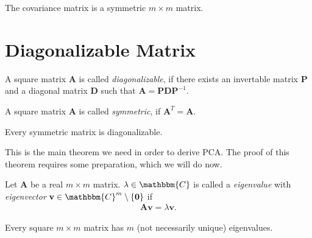 The covariance matrix is a symmetric $m\times m$ matrix.

\section{Diagonalizable Matrix}
\label{sec:diagonalizable_matrix}

\begin{definition}
	A square matrix $\mathbf{A}$ is called \textit{diagonalizable}, if there exists an invertable matrix $\mathbf{P}$ and a diagonal matrix $\mathbf{D}$ such that $\mathbf{A} = \mathbf{P}\mathbf{D}\mathbf{P}^{-1}$.
\end{definition}

\begin{definition}
	A square matrix $\mathbf{A}$ is called \textit{symmetric}, if $\mathbf{A}^T = \mathbf{A}$.
\end{definition}

\begin{theorem}
	\label{th:symmetric_matrix_diagonalizable}
	Every symmetric matrix is diagonalizable.
\end{theorem}

This is the main theorem we need in order to derive PCA. The proof of this theorem requires some preparation, which we will do now.

\begin{definition}
	Let $\mathbf{A}$ be a real $m\times m$ matrix. $\lambda \in \mathbbm{C}$ is called a \textit{eigenvalue} with \textit{eigenvector} $\mathbf{v} \in \mathbbm{C}^m\setminus\{\mathbf{0}\}$ if
	\begin{align}
		\label{eq:def_eigenvalue}
		\mathbf{Av} = \lambda \mathbf{v}.
	\end{align}
\end{definition}

\begin{lemma}
	\label{lem:existence_eigenvalues}
	Every square $m\times m$ matrix has $m$ (not necessarily unique) eigenvalues.
\end{lemma}

